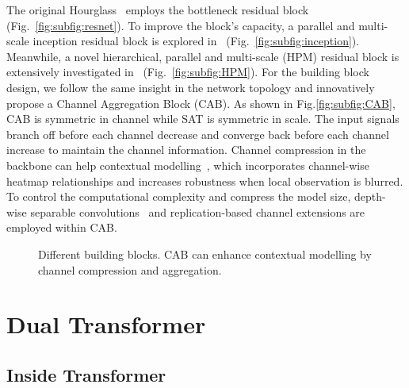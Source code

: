 \documentclass{bmvc2k}
\begin{document}
The original Hourglass~\cite{newell2016stacked} employs the bottleneck residual block (Fig.~\ref{fig:subfig:resnet}). 
To improve the block's capacity, a parallel and multi-scale inception residual block is explored in~\cite{deng2018cascade} (Fig.~\ref{fig:subfig:inception}). Meanwhile, a novel hierarchical, parallel and multi-scale (HPM) residual block is extensively investigated in~\cite{bulat2017binarized,bulat2017far} (Fig.~\ref{fig:subfig:HPM}). 
For the building block design, we follow the same insight in the network topology and innovatively propose a Channel Aggregation Block (CAB). As shown in Fig.\ref{fig:subfig:CAB}, CAB is symmetric in channel while SAT is symmetric in scale. 
The input signals branch off before each channel decrease and converge back before each channel increase to maintain the channel information. Channel compression in the backbone can help contextual modelling~\cite{hu2017squeeze}, which incorporates channel-wise heatmap relationships and increases robustness when local observation is blurred. To control the computational complexity and compress the model size, depth-wise separable convolutions~\cite{howard2017mobilenets} and replication-based channel extensions are employed within CAB.


\begin{figure*}[h!]
\centering
{}
\caption{Different building blocks. CAB can enhance contextual modelling by channel compression and aggregation.}
\vspace{-4mm}
\label{fig:netblock}
\end{figure*}

\section{Dual Transformer}

\subsection{Inside Transformer}
\end{document}
